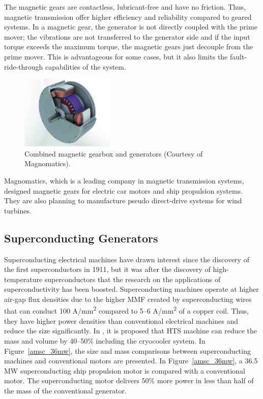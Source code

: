 \documentclass[a4paper, 11pt]{article} %
\begin{document}
The magnetic gears are contactless, lubricant-free and have no friction. Thus, magnetic transmission offer higher efficiency and reliability compared to geared systems. In a magnetic gear, the generator is not directly coupled with the prime mover; the vibrations are not transferred to the generator side and if the input torque exceeds the maximum torque, the magnetic gears just decouple from the prime mover. This is advantageous for some cases, but it also limits the fault-ride-through capabilities of the system.

  \begin{figure}[]
    \centering
    \includegraphics[width=0.4\textwidth]{magnomatics}
    \caption{Combined magnetic gearbox and generators (Courtesy of Magnomatics).} 
    \label{magnomatics}
  \end{figure}


Magnomatics, which is a leading company in magnetic transmission systems, designed magnetic gears for electric car motors and ship propulsion systems. They are also planning to manufacture pseudo direct-drive systems for wind turbines.

\subsection{Superconducting Generators}

Superconducting electrical machines have drawn interest since the discovery of the first superconductors in 1911, but it was after the discovery of high-temperature superconductors that the research on the applications of superconductivity has been boosted. Superconducting machines operate at higher air-gap flux densities due to the higher MMF created by superconducting wires that can conduct 100 A/mm\textsuperscript{2} compared to 5--6 A/mm\textsuperscript{2} of a copper coil. Thus, they have higher power densities than conventional
electrical machines and reduce the size significantly. In \cite{Klaus2006}, it is proposed that HTS machine can reduce the mass and volume by 40--50\% including the cryocooler system. In Figure~\ref{amsc_36mw}, the size and mass comparisons between superconducting machines and conventional motors are presented. In Figure~\ref{amsc_36mw}, a 36.5 MW superconducting ship propulsion motor is compared with a conventional motor. The superconducting motor delivers 50\% more power in less than half of the mass of the conventional generator.
\end{document}

